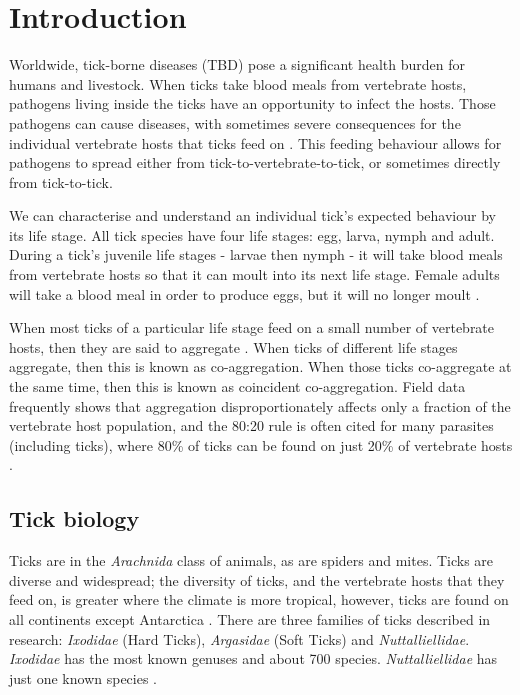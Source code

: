 \documentclass{article}
\begin{document}
\thispagestyle{empty}
\addtocounter{page}{-1}

\newpage

\tableofcontents

\thispagestyle{empty}
\addtocounter{page}{-1}

\newpage

\section{Introduction}

Worldwide, tick-borne diseases (TBD) pose a significant health burden for humans and livestock. When ticks take blood meals from vertebrate hosts, pathogens living inside the ticks have an opportunity to infect the hosts. Those pathogens can cause diseases, with sometimes severe consequences for the individual vertebrate hosts that ticks feed on \cite{Johnson2023e}. This feeding behaviour allows for pathogens to spread either from tick-to-vertebrate-to-tick, or sometimes directly from tick-to-tick.

We can characterise and understand an individual tick's expected behaviour by its life stage. All tick species have four life stages: egg, larva, nymph and adult. During a tick's juvenile life stages - larvae then nymph - it will take blood meals from vertebrate hosts so that it can moult into its next life stage. Female adults will take a blood meal in order to produce eggs, but it will no longer moult \cite{Johnson2023a}.

When most ticks of a particular life stage feed on a small number of vertebrate hosts, then they are said to aggregate \cite{JohnstoneRobertson2020}. When ticks of different life stages aggregate, then this is known as co-aggregation. When those ticks co-aggregate at the same time, then this is known as coincident co-aggregation. Field data frequently shows that aggregation disproportionately affects only a fraction of the vertebrate host population, and the 80:20 rule is often cited for many parasites (including ticks), where 80\% of ticks can be found on just 20\% of vertebrate hosts \cite{Woolhouse1997}.

\subsection{Tick biology}

Ticks are in the \textit{Arachnida} class of animals, as are spiders and mites. Ticks are diverse and widespread; the diversity of ticks, and the vertebrate hosts that they feed on, is greater where the climate is more tropical, however, ticks are found on all continents except Antarctica \cite{Johnson2023a}. There are three families of ticks described in research: \textit{Ixodidae} (Hard Ticks), \textit{Argasidae} (Soft Ticks) and \textit{Nuttalliellidae}. \textit{Ixodidae} has the most known genuses and about 700 species. \textit{Nuttalliellidae} has just one known species \cite{Nicholson2019}.
\end{document}
